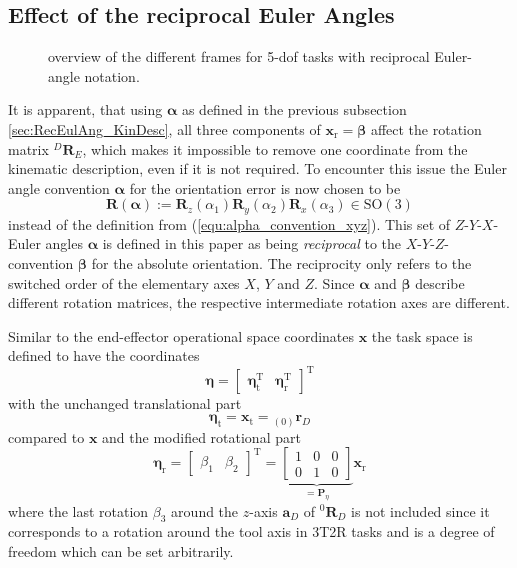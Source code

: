 \documentclass[twocolumn,10pt]{IFTOMM}
\newcommand{\bm}[1]{\boldsymbol{#1}}
\newcommand{\ortvek}[4]{{ }_{(#1)}{\boldsymbol{#2}}^{#3}_{#4} }
\newcommand{\rotmat}[2]{{{ }^{#1}\boldsymbol{R}}_{#2}}
\newcommand{\transp}[0]{{\mathrm{T}}}
\begin{document}
\subsection{Effect of the reciprocal Euler Angles}
\label{sec:RecEulAng_effect}

\begin{figure}[htb]
    
    \caption{overview of the different frames for 5-dof tasks with reciprocal Euler-angle notation.}
    \label{fig:frames_5dof}
\end{figure} 

It is apparent, that using $\bm{\alpha}$ as defined in the previous subsection\,\ref{sec:RecEulAng_KinDesc}, all three components of $\bm{x}_{\mathrm{r}}=\bm{\beta}$ affect the rotation matrix $\rotmat{D}{E}$, which makes it impossible to remove one coordinate from the kinematic description, even if it is not required.
%
To encounter this issue the Euler angle convention $\bm{\alpha}$ for the orientation error is now chosen to be 
%
\begin{equation}
\bm{R}(\bm{\alpha}) := \bm{R}_z(\alpha_1) \bm{R}_y(\alpha_2) \bm{R}_x(\alpha_3) \in \mathrm{SO(3)}
\label{equ:def_rmat_zyxr}
\end{equation}
%
instead of the definition from (\ref{equ:alpha_convention_xyz}).
This set of $Z$-$Y$-$X$-Euler angles $\bm{\alpha}$ is defined in this paper as being \emph{reciprocal} to the $X$-$Y$-$Z$-convention $\bm{\beta}$ for the absolute orientation.
%
The reciprocity only refers to the switched order of the elementary axes $X$, $Y$ and $Z$.
Since $\bm{\alpha}$ and $\bm{\beta}$ describe different rotation matrices, the respective intermediate rotation axes are different.

Similar to the end-effector operational space coordinates $\bm{x}$ the task space is defined to have the coordinates
%
\begin{equation}
\bm{\eta}
=
\begin{bmatrix}
\bm{\eta}_{\mathrm{t}}^\transp & 
\bm{\eta}_{\mathrm{r}}^\transp
\end{bmatrix}^\transp
\end{equation}  
%
with the unchanged translational part
%
\begin{equation}
\bm{\eta}_{\mathrm{t}}
=
\bm{x}_{\mathrm{t}}
=
\ortvek{0}{r}{}{D}
\end{equation}  
%
compared to $\bm{x}$ and the modified rotational part
%
\begin{equation}
\bm{\eta}_{\mathrm{r}}
=
\begin{bmatrix}
\beta_1  & \beta_2
\end{bmatrix}^\transp
=
\underbrace{\begin{bmatrix}
1 & 0 & 0  \\ 
0 & 1 & 0
\end{bmatrix}}_{=\bm{P}_{\eta}}
\bm{x}_{\mathrm{r}}
\label{equ:etar_def}
\end{equation}
%
where the last rotation $\beta_3$ around the $z$-axis $\bm{a}_{D}$ of $\rotmat{0}{D}$ is not included since it corresponds to a rotation around the tool axis in 3T2R tasks and is a degree of freedom which can be set arbitrarily.
\end{document}
